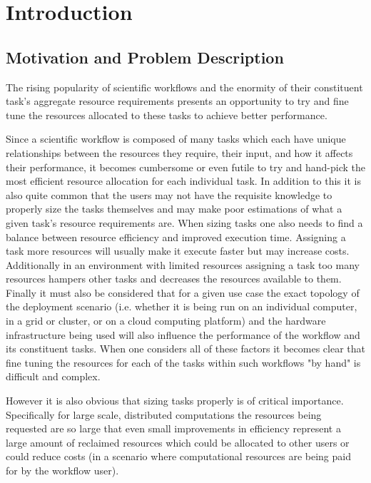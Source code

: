 
\cleardoublepage
\chapter{Introduction}
\label{cha:introduction}

\section{Motivation and Problem Description}
\label{sec:motivation}

The rising popularity of scientific workflows and the enormity of their constituent task's aggregate resource requirements \cite{ResourceProvisioning} presents an opportunity to try and fine tune the resources allocated to these tasks to achieve better performance.

Since a scientific workflow is composed of many tasks which each have unique relationships between the resources they require, their input, and how it affects their performance, it becomes cumbersome or even futile to try and hand-pick the most efficient resource allocation for each individual task. In addition to this it is also quite common that the users may not have the requisite knowledge to properly size the tasks themselves and may make poor estimations \cite{Predictability} of what a given task's resource requirements are. When sizing tasks one also needs to find a balance between resource efficiency and improved execution time. Assigning a task more resources will usually make it execute faster but may increase costs. Additionally in an environment with limited resources assigning a task too many resources hampers other tasks and decreases the resources available to them. Finally it must also be considered that for a given use case the exact topology of the deployment scenario (i.e. whether it is being run on an individual computer, in a grid or cluster, or on a cloud computing platform) and the hardware infrastructure being used will also influence the performance of the workflow and its constituent tasks.  When one considers all of these factors it becomes clear that fine tuning the resources for each of the tasks within such workflows "by hand" is difficult and complex. 

However it is also obvious that sizing tasks properly is of critical importance. Specifically for large scale, distributed computations the resources being requested are so large that even small improvements in efficiency represent a large amount of reclaimed resources which could be allocated to other users or could reduce costs (in a scenario where computational resources are being paid for by the workflow user). 

